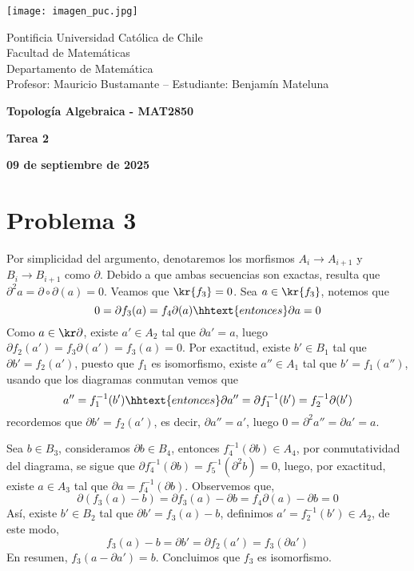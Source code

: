 \documentclass{article}
\begin{document}
\begin{minipage}{2.5cm}
    \texttt{[image: imagen\_puc.jpg]}
\end{minipage}
\begin{minipage}{14cm}
    {\sc Pontificia Universidad Católica de Chile\\
    Facultad de Matemáticas\\
    Departamento de Matemática\\
    Profesor: Mauricio Bustamante -- Estudiante: Benjamín Mateluna}
\end{minipage}
\vspace{1ex}

{\centerline{\bf Topología Algebraica - MAT2850}
\centerline{\bf Tarea 2}}
\centerline{\bf 09 de septiembre de 2025}

\section*{Problema 3}
\noindent Por simplicidad del argumento, denotaremos los morfismos $A_{i}\to A_{i+1}$ y 
$B_{i}\to B_{i+1}$ como $\partial$. Debido a que ambas secuencias son exactas, resulta que 
$\partial^{2}a=\partial\circ\partial (a)=0$. Veamos que $\kr{f_{3}}=0$. Sea $a\in\kr{f_{3}}$,
notemos que
\begin{equation*}
    0=\partial f_{3}(a)=f_{4}\partial(a)\hhtext{entonces}\partial a=0
\end{equation*}
Como $a\in\kr\partial$, existe $a'\in A_{2}$ tal que $\partial a'=a$, luego $\partial f_{2}(a')
=f_{3}\partial(a')=f_{3}(a)=0$. Por exactitud, existe $b'\in B_{1}$ tal que $\partial b'
=f_{2}(a')$, puesto que $f_{1}$ es isomorfismo, existe $a''\in A_{1}$ tal que $b'=f_{1}(a'')$, 
usando que los diagramas conmutan vemos que
\begin{equation*}
    a''=f^{-1}_{1}(b')\hhtext{entonces}\partial a''=\partial f^{-1}_{1}(b')=f^{-1}_{2}\partial(b')
\end{equation*}
recordemos que $\partial b'=f_{2}(a')$, es decir, $\partial a''=a'$, luego 
$0=\partial^{2}a''=\partial a'=a$.

\vspace{2mm}
\noindent Sea $b\in B_{3}$, consideramos $\partial b\in B_{4}$, entonces 
$f^{-1}_{4}(\partial b)\in A_{4}$, por conmutatividad del diagrama, se sigue que
$\partial f_{4}^{-1}(\partial b)=f_{5}^{-1}(\partial^{2}b)=0$, luego, por exactitud, existe
$a\in A_{3}$ tal que $\partial a=f_{4}^{-1}(\partial b)$. Observemos que,
\begin{equation*}
    \partial(f_{3}(a)-b)=\partial f_{3}(a)-\partial b=f_{4}\partial(a)-\partial b=0
\end{equation*}
Así, existe $b'\in B_{2}$ tal que $\partial b'=f_{3}(a)-b$, definimos 
$a'=f_{2}^{-1}(b')\in A_{2}$, de este modo,
\begin{equation*}
    f_{3}(a)-b=\partial b'=\partial f_{2}(a')=f_{3}(\partial a')
\end{equation*}
En resumen, $f_{3}(a-\partial a')=b$. Concluimos que $f_{3}$ es isomorfismo.
\end{document}

